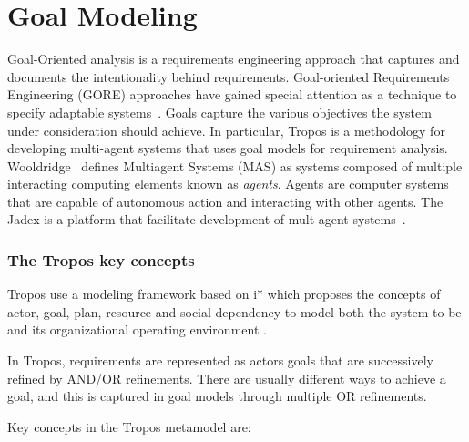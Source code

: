 \section{Goal Modeling}

Goal-Oriented analysis is a requirements engineering approach that captures and documents the intentionality behind requirements. Goal-oriented Requirements Engineering (GORE) approaches have gained special attention as a technique to specify adaptable systems~\cite{morandini_goal-oriented_2009}. Goals capture the various objectives the system under consideration should achieve. In particular, Tropos\cite{bresciani_tropos:_2004} is a methodology for developing multi-agent systems that uses goal models for requirement analysis.
Wooldridge~\cite{woolridge_introduction_2001} defines Multiagent Systems (MAS) as systems composed of multiple interacting computing elements known as \emph{agents}.
Agents are computer systems that are capable of autonomous action and interacting with other agents. The Jadex is a platform that facilitate development of mult-agent systems~\cite{braubach_developing_2012}.

\subsubsection{The Tropos key concepts}

Tropos use a modeling framework based on i* \cite{yu_modelling_1996} which proposes the concepts of actor, goal, plan, resource and social dependency to model both the system-to-be and its organizational operating environment \cite{bresciani_tropos:_2004} \cite{morandini_tropos_2014}.

In Tropos, requirements are represented as actors goals that are successively refined by AND/OR refinements. There are usually different ways to achieve a goal, and this is captured in goal models through multiple OR refinements.

Key concepts in the Tropos metamodel are:

